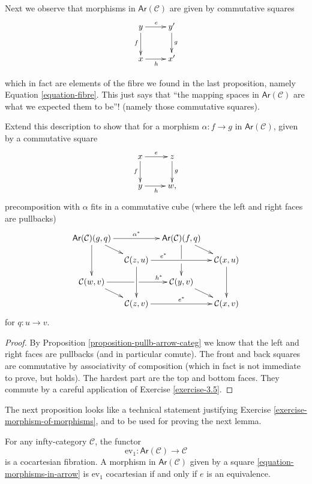 \noindent
Next we observe that morphisms in
$\mathsf{Ar}(\mathcal{C})$
are given by commutative squares
\begin{equation}
\label{equation-morphisms-in-arrow}
\xymatrix{
y\ar[r]^{e}\ar[d]_{f}&y'\ar[d]^{g}\\
x\ar[r]_{h}&x'
}
\end{equation}

\noindent
which in fact are elements of the fibre we
found
in the last proposition, namely Equation
\ref{equation-fibre}.
This just says that ``the mapping spaces in
$\mathsf{Ar}(\mathcal{C})$
are what we expected them to be''!
(namely those commutative squares).

\begin{exercise}
\label{exercise-morphism-of-morphisms}
Extend this description to show that for a
morphism
$\alpha:f \to g$ in
$\mathsf{Ar}(\mathcal{C})$,
given by a commutative square
$$
\xymatrix{
x\ar[r]^{e}\ar[d]_{f}&z\ar[d]^{g}\\
y\ar[r]_{h}&w,
}
$$
precomposition with $\alpha$ fits in a
commutative cube
(where the left and right faces are
pullbacks)
$$
\xymatrix@C=1em@R=1em{
\mathsf{Ar}(\mathcal{C})(g,q)
\ar[rr]^{\alpha^*} \ar[dd] \ar[rd] & &
\mathsf{Ar}(\mathcal{C})(f,q) \ar'[d][dd]
\ar[rd] \\
 & \mathcal{C}(z,u) \ar[rr]^(0.3){e^*}
 \ar[dd] & & \mathcal{C}(x,u) \ar[dd] \\
\mathcal{C}(w,v) \ar'[r][rr]^{h^*} \ar[rd] &
& \mathcal{C}(y,v) \ar[rd] \\
 & \mathcal{C}(z,v) \ar[rr]^{e^*} & &
 \mathcal{C}(x,v)
}
$$
for $q:u \to v$.
\end{exercise}

\begin{proof}
By Proposition
\ref{proposition-pullb-arrow-categ}
we know that the left and right faces are
pullbacks
(and in particular comute).
The front and back squares are
commutative by associativity of composition
(which in fact is not immediate to prove, but
holds).
The hardest part are the top and bottom
faces.
They commute by a careful application of
Exercise \ref{exercise-3.5}.
\end{proof}

\noindent
The next proposition looks like a technical
statement
justifying Exercise
\ref{exercise-morphism-of-morphisms},
and to be used for proving the next lemma.

\begin{proposition}
\label{proposition-evaluation-and-arrow}
For any infty-category $\mathcal{C}$,
the functor
$$
\text{ev}_1:\mathsf{Ar}(\mathcal{C})
\to\mathcal{C}
$$
is a cocartesian fibration.
A morphism in $\mathsf{Ar}(\mathcal{C})$
given by a square
\ref{equation-morphisms-in-arrow}
is $\text{ev}_1$ cocartesian if and only if
$e$
is an equivalence.
\end{proposition}

